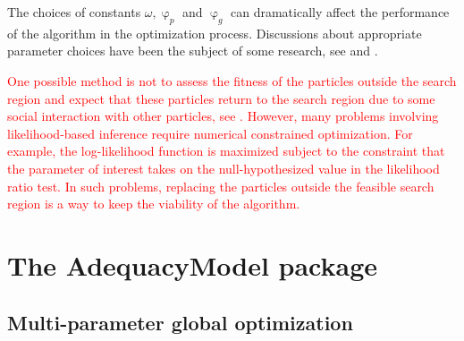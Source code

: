 \documentclass[10pt,letterpaper]{article}
\begin{document}
The choices of constants $\omega, \upvarphi_p$ and $\upvarphi_g$ can dramatically affect the performance of the algorithm in the optimization process.
Discussions about appropriate parameter choices have been the subject of some research, see \cite{kennedyetal2001} and \cite{bratton2008simplified}.

\textcolor{red}{One possible method is not to assess the fitness of the particles outside the search region
and expect that these particles return to the search region due to some social interaction with other particles, see  \cite{brattonkennedy2007}.
However, many problems involving likelihood-based inference require numerical constrained optimization.
For example, the log-likelihood function is maximized subject to the constraint that the parameter of interest takes on the null-hypothesized value in the likelihood ratio test.
In such problems, replacing the particles outside the feasible search region is a way to keep the viability of the algorithm.}


\section{The AdequacyModel package}

\subsection{Multi-parameter global optimization}
\end{document}
